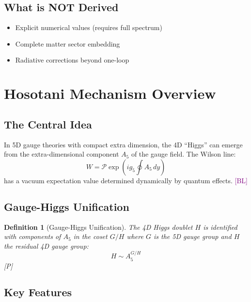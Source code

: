 \documentclass[11pt,a4paper]{article}
\newtheorem{definition}[theorem]{Definition}
\newcommand{\tagP}{\textcolor{green!50!black}{[P]}}
\newcommand{\tagBL}{\textcolor{purple}{[BL]}}
\begin{document}
\subsection{What is NOT Derived}
\begin{itemize}
    \item Explicit numerical values (requires full spectrum)
    \item Complete matter sector embedding
    \item Radiative corrections beyond one-loop
\end{itemize}

\section{Hosotani Mechanism Overview}

\subsection{The Central Idea}

In 5D gauge theories with compact extra dimension, the 4D ``Higgs'' can emerge
from the extra-dimensional component $A_5$ of the gauge field. The Wilson line:
\begin{equation}
\label{eq:wilson-def}
W = \mathcal{P} \exp\left(ig_5 \oint A_5 \, dy\right)
\end{equation}
has a vacuum expectation value determined dynamically by quantum effects. \tagBL

\subsection{Gauge-Higgs Unification}

\begin{definition}[Gauge-Higgs Unification]
\label{def:ghu}
The 4D Higgs doublet $H$ is identified with components of $A_5$ in the coset
$G/H$ where $G$ is the 5D gauge group and $H$ the residual 4D gauge group:
\begin{equation}
\label{eq:ghu}
H \sim A_5^{G/H}
\end{equation}
\tagP
\end{definition}

\subsection{Key Features}
\end{document}
